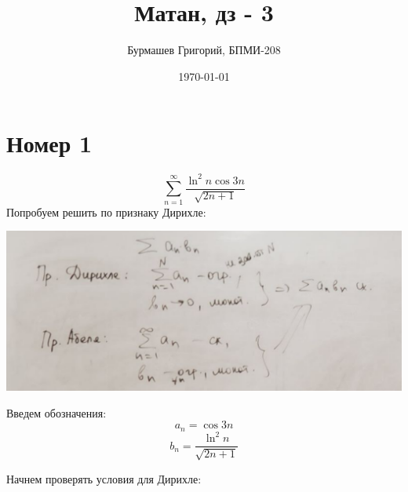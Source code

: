 \documentclass[a4paper,12pt]{article}
\author{Бурмашев Григорий, БПМИ-208}
\title{Матан, дз - 3}
\date{\today}
\begin{document}
\maketitle
\section*{Номер 1}
\[
\sum_{n = 1}^{\infty} \frac{\ln^2n \cos 3n}{\sqrt{2n + 1}}
\]
Попробуем решить по признаку Дирихле:
\begin{center}
\includegraphics[scale=0.4]{1.png}
\end{center}
Введем обозначения:
\[
a_n = \cos 3n
\]
\[
b_n = \frac{\ln^2 n}{ \sqrt{2n + 1}}
\]
\clearpage
\begin{center}
Начнем проверять условия для Дирихле:
\end{center}
\end{document}
